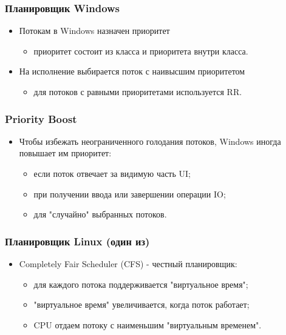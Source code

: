 \begin{frame}
\frametitle{Планировщик Windows}
\begin{itemize}
    \item<1->Потокам в Windows назначен приоритет
    \begin{itemize}
        \item<1->приоритет состоит из класса и приоритета внутри класса.
    \end{itemize}
    \item<2->На исполнение выбирается поток с наивысшим приоритетом
    \begin{itemize}
        \item<3->для потоков с равными приоритетами используется RR.
    \end{itemize}
\end{itemize}
\end{frame}

\begin{frame}
\frametitle{Priority Boost}
\begin{itemize}
    \item<1->Чтобы избежать неограниченного голодания потоков, Windows иногда
         повышает им приоритет:
    \begin{itemize}
        \item<2->если поток отвечает за видимую часть UI;
        \item<3->при получении ввода или завершении операции IO;
        \item<4->для "случайно" выбранных потоков.
    \end{itemize}
\end{itemize}
\end{frame}


\begin{frame}
\frametitle{Планировщик Linux (один из)}
\begin{itemize}
    \item<1->Completely Fair Scheduler (CFS) - честный планировщик:
    \begin{itemize}
        \item<2->для каждого потока поддерживается "виртуальное время";
        \item<3->"виртуальное время" увеличивается, когда поток работает;
        \item<4->CPU отдаем потоку с наименьшим "виртуальным временем".
    \end{itemize}
\end{itemize}
\end{frame}
